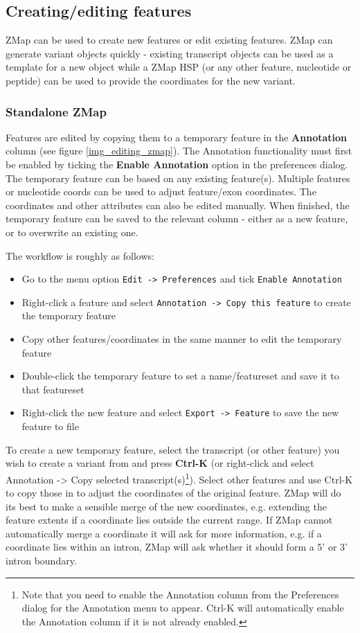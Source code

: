 \documentclass[letterpaper]{article}
\begin{document}
\subsection{Creating/editing features}
ZMap can be used to create new features or edit existing features. ZMap can generate variant objects quickly - existing transcript objects can be used as a template for a new object while a ZMap HSP (or any other feature, nucleotide or peptide) can be used to provide the coordinates for the new variant.

\subsubsection{Standalone ZMap}
Features are edited by copying them to a temporary feature in the \textbf{Annotation} column (see figure \ref{img_editing_zmap}). The Annotation functionality must first be enabled by ticking the \textbf{Enable Annotation} option in the preferences dialog. The temporary feature can be based on any existing feature(s). Multiple features or nucleotide coords can be used to adjust feature/exon coordinates. The coordinates and other attributes can also be edited manually. When finished, the temporary feature can be saved to the relevant column - either as a new feature, or to overwrite an existing one. 

The workflow is roughly as follows:
\begin{itemize}
\item Go to the menu option \texttt{Edit -> Preferences} and tick \texttt{Enable Annotation}
\item Right-click a feature and select \texttt{Annotation -> Copy this feature} to create the temporary feature
\item Copy other features/coordinates in the same manner to edit the temporary feature
\item Double-click the temporary feature to set a name/featureset and save it to that featureset
\item Right-click the new feature and select \texttt{Export -> Feature} to save the new feature to file
\end{itemize}

To create a new temporary feature, select the transcript (or other feature) you wish to create a variant from and press \textbf{Ctrl-K} (or right-click and select Annotation -> Copy selected transcript(s)\footnote{Note that you need to enable the Annotation column from the Preferences dialog for the Annotation menu to appear. Ctrl-K will automatically enable the Annotation column if it is not already enabled.}). Select other features and use Ctrl-K to copy those in to adjust the coordinates of the original feature. ZMap will do its best to make a sensible merge of the new coordinates, e.g. extending the feature extents if a coordinate lies outside the current range. If ZMap cannot automatically merge a coordinate it will ask for more information, e.g. if a coordinate lies within an intron, ZMap will ask whether it should form a 5' or 3' intron boundary.
\end{document}
